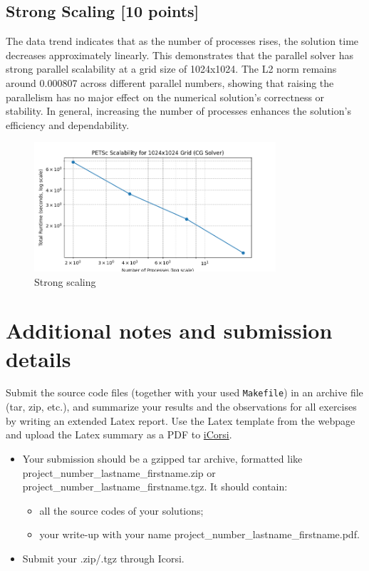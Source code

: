 \documentclass[unicode,11pt,a4paper,oneside,numbers=endperiod,openany]{scrartcl}
\begin{document}
\subsection{Strong Scaling [10 points]}
The data trend indicates that as the number of processes rises, the solution time decreases approximately linearly. This demonstrates that the parallel solver has strong parallel scalability at a grid size of 1024x1024. The L2 norm remains around 0.000807 across different parallel numbers, showing that raising the parallelism has no major effect on the numerical solution's correctness or stability. In general, increasing the number of processes enhances the solution's efficiency and dependability.
\begin{figure}[h]
    \centering
    \includegraphics[width=0.8\textwidth]{images/Figure_2.png}
    \caption{Strong scaling}
\end{figure}





\section*{Additional notes and submission details}
Submit the source code files (together with your used \texttt{Makefile}) in
an archive file (tar, zip, etc.), and summarize your results and the
observations for all exercises by writing an extended Latex report.
Use the Latex template from the webpage and upload the Latex summary
as a PDF to \href{https://www.icorsi.ch}{iCorsi}.

\begin{itemize}
	\item Your submission should be a gzipped tar archive, formatted like project\_number\_lastname\_firstname.zip or project\_number\_lastname\_firstname.tgz. 
	It should contain:
	\begin{itemize}
		\item all the source codes of your solutions;
		\item your write-up with your name  project\_number\_lastname\_firstname.pdf.
	\end{itemize}
	\item Submit your .zip/.tgz through Icorsi.
\end{itemize}
\end{document}
